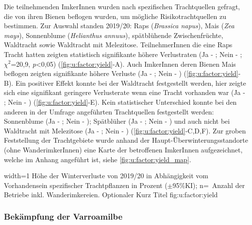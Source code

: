 Die teilnehmenden ImkerInnen wurden nach spezifischen Trachtquellen gefragt, die von ihren Bienen beflogen wurden, um mögliche Risikotrachtquellen zu bestimmen. Zur Auswahl standen 2019/20: Raps (\textit{Brassica napus}), Mais (\textit{Zea mays}), Sonnenblume (\textit{Helianthus annuus}), spätblühende Zwischenfrüchte, Waldtracht sowie Waldtracht mit Melezitose.
\newline
TeilnehmerInnen die eine Raps Tracht hatten zeigten statistisch signifikante höhere Verlustraten (Ja - ; Nein - ; $\chi^{2}$=20,9, \textit{p}<0,05) (\cref{fig:u:factor:yield}-A). Auch ImkerInnen deren Bienen Mais beflogen zeigten signifikante höhere Verluste (Ja - ; Nein - ) (\cref{fig:u:factor:yield}-B).
\newline
Ein positiver Effekt konnte bei der Waldtracht festgestellt werden, hier zeigte sich eine signifikant geringere Verlusterate wenn eine Tracht vorhanden war (Ja - ; Nein - ) (\cref{fig:u:factor:yield}-E).
\newline
Kein statistischer Unterschied konnte bei den anderen in der Umfrage angeführten Trachtquellen festgestellt werden: Sonnenblume (Ja - ; Nein - ); Spätblüher (Ja - ; Nein - ) und auch nicht bei Waldtracht mit Melezitose (Ja - ; Nein - ) (\cref{fig:u:factor:yield}-C,D,F).
\newline
Zur groben Feststellung der Trachtgebiete wurde anhand der Haupt-Überwinterungsstandorte (ohne WanderimkerInnen) eine Karte der betroffenen ImkerInnen aufgezeichnet, welche im Anhang angeführt ist, siehe \cref{fig:u:factor:yield_map}.

{width=1\textwidth} %
{Höhe der Winterverluste von 2019/20 in Abhängigkeit vom Vorhandensein spezifischer Trachtpflanzen in Prozent ($\pm$95\%KI); n=~Anzahl der Betriebe inkl. Wanderimkereien.} %
{Optionaler Kurz Titel} %
{fig:u:factor:yield} %

\subsubsection{Bekämpfung der Varroamilbe}
\label{ss:baekempfung_varroa:U}

